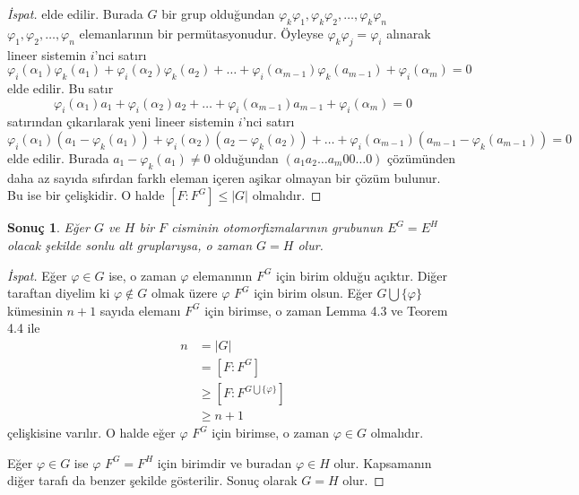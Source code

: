\documentclass[draft]{article}
\newtheorem{cor}[thm]{Sonuç}
\theoremstyle{definition}
\theoremstyle{remark}
\newcommand{\envert}[1]{\left\lvert#1\right\rvert}
\let\abs=\envert
\begin{document}
\begin{proof}[İspat]
    	        elde edilir. Burada $G$ bir grup olduğundan $\varphi_k\varphi_1, \varphi_k\varphi_2, \dots, \varphi_k\varphi_n$ $\varphi_1, \varphi_2, \dots, \varphi_n$ elemanlarının bir permütasyonudur. Öyleyse $\varphi_k\varphi_j = \varphi_i$ alınarak lineer sistemin $i$'nci satırı
    	        \begin{equation*}
    	            \varphi_i(\alpha_1)\varphi_k(a_1) + \varphi_i(\alpha_2)\varphi_k(a_2) + \dots + \varphi_i(\alpha_{m - 1})\varphi_k(a_{m - 1}) + \varphi_i(\alpha_m) = 0
    	        \end{equation*}
    	        elde edilir. Bu satır
    	        \begin{equation*}
    	            \varphi_i(\alpha_1)a_1 + \varphi_i(\alpha_2)a_2 + \dots + \varphi_i(\alpha_{m - 1})a_{m - 1} + \varphi_i(\alpha_m) = 0
    	        \end{equation*}
    	        satırından çıkarılarak yeni lineer sistemin $i$'nci satırı
    	        \begin{equation*}
    	            \varphi_i(\alpha_1)(a_1 - \varphi_k(a_1)) + \varphi_i(\alpha_2)(a_2 - \varphi_k(a_2)) + \dots + \varphi_i(\alpha_{m - 1})(a_{m - 1} - \varphi_k(a_{m - 1})) = 0
    	        \end{equation*}
    	        elde edilir. Burada $a_1 - \varphi_k(a_1) \neq 0$ olduğundan $(a_1 a_2 \dots a_m 0 0 \dots 0)$ çözümünden daha az sayıda sıfırdan farklı eleman içeren aşikar olmayan bir çözüm bulunur. Bu ise bir çelişkidir. O halde $[F : F^G] \leq \abs{G}$ olmalıdır.
    	    \end{proof}
    		
    		\begin{cor}
    		    Eğer $G$ ve $H$ bir $F$ cisminin otomorfizmalarının grubunun $E^G = E^H$ olacak şekilde sonlu alt gruplarıysa, o zaman $G = H$ olur.
    		\end{cor}
    		
    		\begin{proof}[İspat]
    	        Eğer $\varphi \in G$ ise, o zaman $\varphi$ elemanının $F^G$ için birim olduğu açıktır. Diğer taraftan diyelim ki $\varphi \notin G$ olmak üzere $\varphi$ $F^G$ için birim olsun. Eğer $G \bigcup \{\varphi\}$ kümesinin $n + 1$ sayıda elemanı $F^G$ için birimse, o zaman Lemma 4.3 ve Teorem 4.4 ile
    	        \begin{align*}
    	            n &= \abs{G}\\
    	            &= [F : F^G]\\
    	            &\geq [F : F^{G \bigcup \{\varphi\}}]\\
    	            &\geq n + 1
    	        \end{align*}
    	        çelişkisine varılır. O halde eğer $\varphi$ $F^G$ için birimse, o zaman $\varphi \in G$ olmalıdır.\par
    	        Eğer $\varphi \in G$ ise $\varphi$ $F^G = F^H$ için birimdir ve buradan $\varphi \in H$ olur. Kapsamanın diğer tarafı da benzer şekilde gösterilir. Sonuç olarak $G = H$ olur.
    	    \end{proof}
    		
\end{document}

